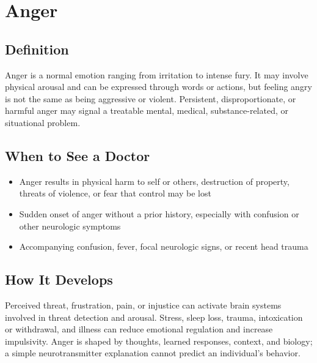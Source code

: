 \chapter{Anger}

\section*{Definition}
Anger is a normal emotion ranging from irritation to intense fury. It may involve physical arousal and can be expressed through words or actions, but feeling angry is not the same as being aggressive or violent. Persistent, disproportionate, or harmful anger may signal a treatable mental, medical, substance-related, or situational problem.

\section*{When to See a Doctor}

\begin{itemize}
 \item Anger results in physical harm to self or others, destruction of property, threats of violence, or fear that control may be lost
 \item Sudden onset of anger without a prior history, especially with confusion or other neurologic symptoms
 \item Accompanying confusion, fever, focal neurologic signs, or recent head trauma
\end{itemize}

\section*{How It Develops}
Perceived threat, frustration, pain, or injustice can activate brain systems involved in threat detection and arousal. Stress, sleep loss, trauma, intoxication or withdrawal, and illness can reduce emotional regulation and increase impulsivity. Anger is shaped by thoughts, learned responses, context, and biology; a simple neurotransmitter explanation cannot predict an individual's behavior.

